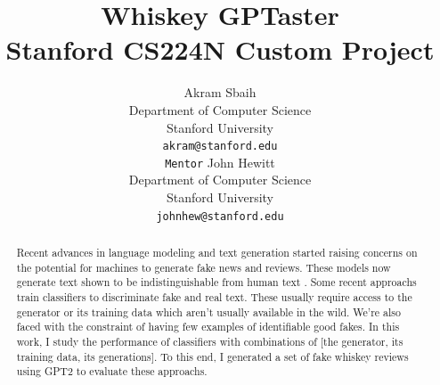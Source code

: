 \documentclass{article}
\title{
  Whiskey GPTaster \\
  \vspace{1em}
  \small{\normalfont Stanford CS224N Custom Project}  %
}
\author{
  Akram Sbaih \\
  Department of Computer Science \\
  Stanford University \\
  \texttt{akram@stanford.edu} \\
   \And
   \texttt{Mentor} John Hewitt \\
   Department of Computer Science \\
   Stanford University \\
   \texttt{johnhew@stanford.edu} \\
}
\begin{document}
\maketitle

\begin{abstract}
Recent advances in language modeling and text generation started raising concerns on the potential for machines to generate fake news and reviews. These models now generate text shown to be indistinguishable from human text \cite{adelani2019generating}. Some recent approachs \cite{zellers2020defending} train classifiers to discriminate fake and real text. These usually require access to the generator or its training data which aren't usually available in the wild. We're also faced with the constraint of having few examples of identifiable good fakes. In this work, I study the performance of classifiers with combinations of [the generator, its training data, its generations]. To this end, I generated a set of fake whiskey reviews using GPT2 to evaluate these approachs.
\end{abstract}



\end{document}

